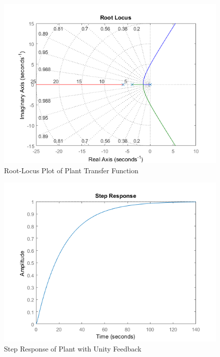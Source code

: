 \documentclass[12pt]{article}
\begin{document}
\begin{multicols}{2}
\begin{flushleft}
\begin{figure}[H]
\centering
\includegraphics[scale=0.7]{Plant_Root_Locus.png}
\caption{Root-Locus Plot of Plant Transfer Function}
\end{figure}

\begin{figure}[H]
\centering
\includegraphics[scale=0.7]{StepResponse.png}
\caption{Step Response of Plant with Unity Feedback}
\end{figure}
\end{flushleft}
\end{multicols}
\end{document}
